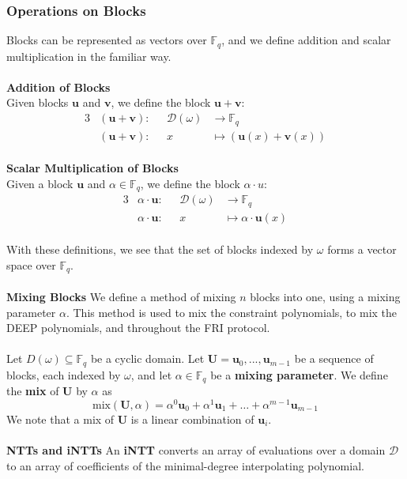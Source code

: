 \documentclass[10pt,letterpaper,titlepage]{article}
\newcommand{\GF}[1]{\mathbb{F}_{#1}}
\newcommand{\w}[0]{\omega}
\newcommand{\D}[0]{\mathcal{D}}
\theoremstyle{definition}
\begin{document}
\begin{appendices}
\subsubsection{Operations on Blocks}
\label{operations}
Blocks can be represented as vectors over $\GF{q}$, and we define addition and scalar multiplication in the familiar way. \\
\\
\textbf{Addition of Blocks}\\
Given blocks $\mathbf{u}$ and $\mathbf{v}$, we define the block $\mathbf{u}+\mathbf{v}$:
\begin{alignat*}{3}
&(\mathbf{u}+\mathbf{v}):\text{ }&\D(\w)&\longrightarrow\GF{q}\\
&(\mathbf{u}+\mathbf{v}):&x&\longmapsto (\mathbf{u}(x)+\mathbf{v}(x))
\end{alignat*}\\
\textbf{Scalar Multiplication of Blocks}\\
Given a block $\mathbf{u}$ and $\alpha\in\GF{q}$, we define the block $\alpha\cdot u$:
\begin{alignat*}{3}
&\alpha\cdot \mathbf{u}: \text{ }&\D(\w)&\longrightarrow\GF{q}\\
&\alpha\cdot \mathbf{u}: &x&\longmapsto\alpha \cdot \mathbf{u}(x)
\end{alignat*}
\\
With these definitions, we see that the set of blocks indexed by $\w$ forms a vector space over $\GF{q}$.\\
\\
\textbf{Mixing Blocks}
\label{mix}
We define a method of mixing $n$ blocks into one, using a mixing parameter $\alpha$. 
This method is used to mix the constraint polynomials, to mix the DEEP polynomials, and throughout the FRI protocol. \\
\\
Let $D(\w)\subseteq\mathbb{F}_q$ be a cyclic domain. Let $\mathbf{U}=\mathbf{u}_0,...,\mathbf{u}_{m-1}$ be a sequence of blocks, each indexed by $\w$, and let $\alpha\in\GF{q}$ be a \textbf{mixing parameter}.
We define the \textbf{mix} of $\mathbf{U}$ by $\alpha$ as $$\text{mix}(\mathbf{U},\alpha)=\alpha^0\mathbf{u}_0+\alpha^1\mathbf{u}_1+\ldots+\alpha^{m-1}\mathbf{u}_{m-1}$$
We note that a mix of $\mathbf{U}$ is a linear combination of $\mathbf{u}_i$.\\
\\
\textbf{NTTs and iNTTs}
\label{ntt}
\label{intt}
\noindent
An \textbf{iNTT} converts an array of evaluations over a domain $\D$ to an array of coefficients of the minimal-degree interpolating polynomial. 

\end{appendices}
\end{document}
